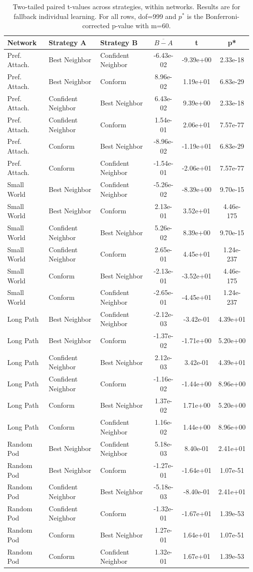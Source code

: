 \begin{table}[]
    \label{tab:t-innet-fallback}
    \centering
    \begin{tabular}{l|ll|ccc}
        Network & Strategy A & Strategy B & $\overline{B - A}$ & t & p* \\
        \hline
Pref. Attach.&Best Neighbor&Confident Neighbor&-6.43e-02&-9.39e+00&2.33e-18\\
Pref. Attach.&Best Neighbor&Conform&8.96e-02&1.19e+01&6.83e-29\\
Pref. Attach.&Confident Neighbor&Best Neighbor&6.43e-02&9.39e+00&2.33e-18\\
Pref. Attach.&Confident Neighbor&Conform&1.54e-01&2.06e+01&7.57e-77\\
Pref. Attach.&Conform&Best Neighbor&-8.96e-02&-1.19e+01&6.83e-29\\
Pref. Attach.&Conform&Confident Neighbor&-1.54e-01&-2.06e+01&7.57e-77\\
\hline
Small World&Best Neighbor&Confident Neighbor&-5.26e-02&-8.39e+00&9.70e-15\\
Small World&Best Neighbor&Conform&2.13e-01&3.52e+01&4.46e-175\\
Small World&Confident Neighbor&Best Neighbor&5.26e-02&8.39e+00&9.70e-15\\
Small World&Confident Neighbor&Conform&2.65e-01&4.45e+01&1.24e-237\\
Small World&Conform&Best Neighbor&-2.13e-01&-3.52e+01&4.46e-175\\
Small World&Conform&Confident Neighbor&-2.65e-01&-4.45e+01&1.24e-237\\
\hline
Long Path&Best Neighbor&Confident Neighbor&-2.12e-03&-3.42e-01&4.39e+01\\
Long Path&Best Neighbor&Conform&-1.37e-02&-1.71e+00&5.20e+00\\
Long Path&Confident Neighbor&Best Neighbor&2.12e-03&3.42e-01&4.39e+01\\
Long Path&Confident Neighbor&Conform&-1.16e-02&-1.44e+00&8.96e+00\\
Long Path&Conform&Best Neighbor&1.37e-02&1.71e+00&5.20e+00\\
Long Path&Conform&Confident Neighbor&1.16e-02&1.44e+00&8.96e+00\\
\hline
Random Pod&Best Neighbor&Confident Neighbor&5.18e-03&8.40e-01&2.41e+01\\
Random Pod&Best Neighbor&Conform&-1.27e-01&-1.64e+01&1.07e-51\\
Random Pod&Confident Neighbor&Best Neighbor&-5.18e-03&-8.40e-01&2.41e+01\\
Random Pod&Confident Neighbor&Conform&-1.32e-01&-1.67e+01&1.39e-53\\
Random Pod&Conform&Best Neighbor&1.27e-01&1.64e+01&1.07e-51\\
Random Pod&Conform&Confident Neighbor&1.32e-01&1.67e+01&1.39e-53\\
\hline
    \end{tabular}
    \caption{Two-tailed paired t-values across strategies, within networks. Results are for fallback individual learning. For all rows, dof=999 and $p^*$ is the Bonferroni-corrected p-value with m=60.}
\end{table}

